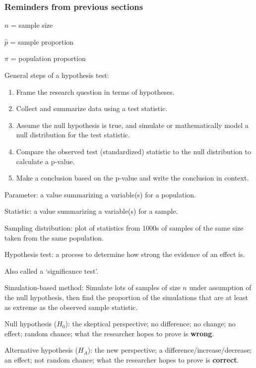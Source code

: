 \documentclass[
]{report}
\newcommand{\rgi}{\hspace{24pt}}  %
\begin{document}
\hypertarget{reminders-from-previous-sections-2}{%
\subsubsection*{Reminders from previous sections}\label{reminders-from-previous-sections-2}}

\(n\) = sample size

\(\hat{p}\) = sample proportion

\(\pi\) = population proportion

General steps of a hypothesis test:

\begin{enumerate}
\def\labelenumi{\arabic{enumi}.}
\item
  Frame the research question in terms of hypotheses.
\item
  Collect and summarize data using a test statistic.
\item
  Assume the null hypothesis is true, and simulate or mathematically model a null distribution for the test statistic.
\item
  Compare the observed test (standardized) statistic to the null distribution to calculate a p-value.
\item
  Make a conclusion based on the p-value and write the conclusion in context.
\end{enumerate}

Parameter: a value summarizing a variable(s) for a population.

Statistic: a value summarizing a variable(s) for a sample.

Sampling distribution: plot of statistics from 1000s of samples of the same size taken from the same population.

Hypothesis test: a process to determine how strong the evidence of an effect is.

\rgi Also called a `significance test'.

Simulation-based method: Simulate lots of samples of size \(n\) under assumption of the null hypothesis, then find the proportion of the simulations that are at least as extreme as the observed sample statistic.

Null hypothesis (\(H_0\)): the skeptical perspective; no difference; no change; no effect; random chance; what the researcher hopes to prove is \textbf{wrong}.

Alternative hypothesis (\(H_A\)): the new perspective; a difference/increase/decrease; an effect; not random chance; what the researcher hopes to prove is \textbf{correct}.
\end{document}

